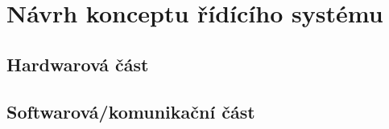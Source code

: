 \chapter{Návrh konceptu řídícího systému}


\section{Hardwarová část}

\begin{figure}[H]
    \centering
    \def\svgwidth{\columnwidth}
    
\end{figure}

\section{Softwarová/komunikační část}

\begin{figure}[H]
    \centering
    \def\svgwidth{\columnwidth}
    
\end{figure}